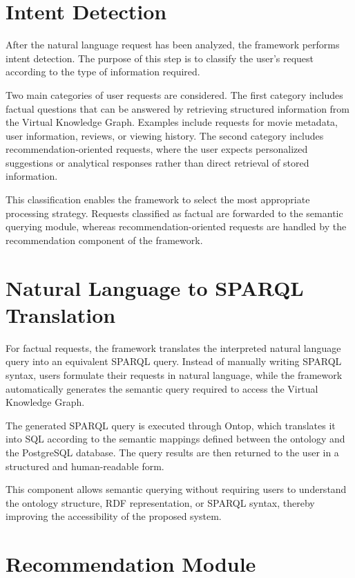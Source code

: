 \section{Intent Detection}

After the natural language request has been analyzed, the framework performs intent detection. The purpose of this step is to classify the user's request according to the type of information required.

Two main categories of user requests are considered. The first category includes factual questions that can be answered by retrieving structured information from the Virtual Knowledge Graph. Examples include requests for movie metadata, user information, reviews, or viewing history. The second category includes recommendation-oriented requests, where the user expects personalized suggestions or analytical responses rather than direct retrieval of stored information.

This classification enables the framework to select the most appropriate processing strategy. Requests classified as factual are forwarded to the semantic querying module, whereas recommendation-oriented requests are handled by the recommendation component of the framework.
\section{Natural Language to SPARQL Translation}

For factual requests, the framework translates the interpreted natural language query into an equivalent SPARQL query. Instead of manually writing SPARQL syntax, users formulate their requests in natural language, while the framework automatically generates the semantic query required to access the Virtual Knowledge Graph.

The generated SPARQL query is executed through Ontop, which translates it into SQL according to the semantic mappings defined between the ontology and the PostgreSQL database. The query results are then returned to the user in a structured and human-readable form.

This component allows semantic querying without requiring users to understand the ontology structure, RDF representation, or SPARQL syntax, thereby improving the accessibility of the proposed system.
\section{Recommendation Module}

